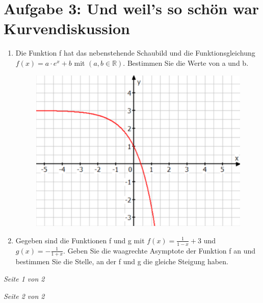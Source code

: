 \documentclass[11pt,a4paper, parskip=half ]{report}
\begin{document}
\section*{Aufgabe 3: Und weil's so schön war Kurvendiskussion}
\begin{enumerate}
  \item Die Funktion f  hat das nebenstehende Schaubild und die	Funktionsgleichung $f(x) = a\cdot e^x + b$ mit $(a,b \in \mathbb{R})$. Bestimmen Sie die Werte von a und b.
  \begin{figure}
    \includegraphics{media/Bild1.png}
  \end{figure}
  \item Gegeben sind die Funktionen f und g mit $f(x) = \frac{1}{1-x}+3$ und $g(x)=-\frac{1}{1+x}$.	Geben Sie die waagrechte Asymptote der Funktion f an und bestimmen Sie die Stelle, an der f und g  die gleiche Steigung haben.
\end{enumerate}

\vfill
\begin{flushright}\textit{Seite 1 von 2}\end{flushright}\newpage



\vfill
\begin{flushright}\textit{Seite 2 von 2}\end{flushright}%
\end{document}
